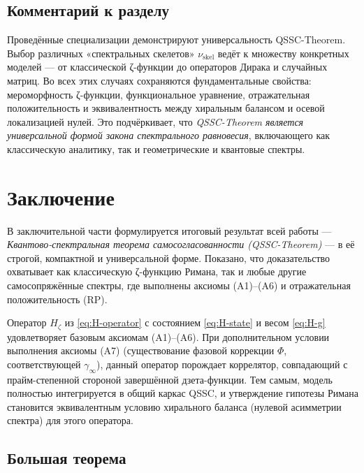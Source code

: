 \documentclass{article}
\numberwithin{equation}{section}
\theoremstyle{plain}
\theoremstyle{definition}
\theoremstyle{remark}
\def\infty{∞}\def\partial{∂}\def\sum{Σ}\def\int{∫}%
\begin{document}
\subsection{Комментарий к разделу}
\label{subsec:summary11}

Проведённые специализации демонстрируют универсальность QSSC-Theorem.
Выбор различных «спектральных скелетов» $\nu_{\mathrm{skel}}$
ведёт к множеству конкретных моделей --- от классической ζ-функции до операторов Дирака
и случайных матриц. Во всех этих случаях сохраняются фундаментальные свойства:
мероморфность ζ-функции, функциональное уравнение, отражательная положительность
и эквивалентность между хиральным балансом и осевой локализацией нулей.
Это подчёркивает, что \emph{QSSC-Theorem является универсальной формой
закона спектрального равновесия}, включающего как классическую аналитику,
так и геометрические и квантовые спектры.

\clearpage

\section{Заключение}
\label{sec:conclusion}

\noindent
В заключительной части формулируется итоговый результат всей работы —
\emph{Квантово-спектральная теорема самосогласованности (QSSC-Theorem)} —
в её строгой, компактной и универсальной форме.
Показано, что доказательство охватывает как классическую ζ-функцию Римана,
так и любые другие самосопряжённые спектры,
где выполнены аксиомы (A1)–(A6) и отражательная положительность (RP).

Оператор $H_\zeta$ из \eqref{eq:H-operator} с состоянием \eqref{eq:H-state} и весом \eqref{eq:H-g} 
удовлетворяет базовым аксиомам (A1)–(A6). При дополнительном условии выполнения аксиомы (A7) 
(существование фазовой коррекции $\Phi$, соответствующей $\gamma_\infty$), данный оператор порождает коррелятор, 
совпадающий с прайм-степенной стороной завершённой дзета-функции. 
Тем самым, модель полностью интегрируется в общий каркас QSSC, и утверждение гипотезы 
Римана становится эквивалентным условию хирального баланса (нулевой асимметрии спектра) 
для этого оператора.

\subsection{Большая теорема}
\label{subsec:main_theorem}
\end{document}
